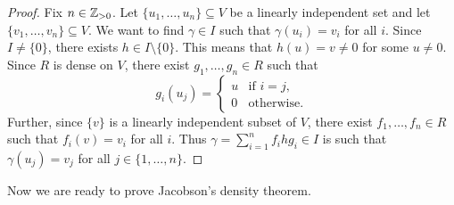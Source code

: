 \begin{proof}
    Fix $n\in\mathbb{Z}_{>0}$. Let 
    $\{u_1,\dots,u_n\}\subseteq V$ be a linearly independent set 
	and let $\{v_1,\dots,v_n\}\subseteq V$. We want to find $\gamma\in I$ such that 
	$\gamma(u_i)=v_i$ for all $i$. Since $I\ne\{0\}$, there exists 
	$h\in I\setminus\{0\}$. This means that 
	$h(u)=v\ne0$ for some $u\ne 0$. Since $R$ is 
	dense on $V$, there exist $g_1,\dots,g_n\in R$ such that 
	\[
	g_i(u_j)=\begin{cases} 
	u & \text{if $i=j$},\\
	0 & \text{otherwise}.
	\end{cases}
	\]
	Further, since $\{v\}$ is a linearly independent subset of $V$, 
	there exist $f_1,\dots,f_n\in R$ such that 
	$f_i(v)=v_i$ for all $i$. Thus $\gamma=\sum_{i=1}^n f_ihg_i\in I$ is such that 
	$\gamma(u_j)=v_j$ for all $j\in\{1,\dots,n\}$.
\end{proof}

Now we are ready to prove Jacobson's density theorem. 

